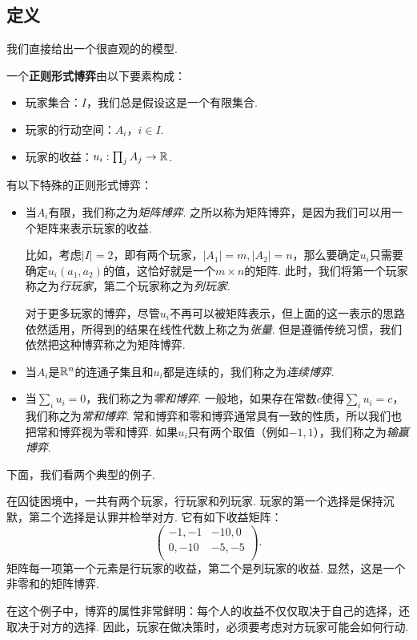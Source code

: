 \subsection{定义}

我们直接给出一个很直观的的模型. 

\begin{definition}[正则形式博弈]
一个\textbf{正则形式博弈}由以下要素构成：
\begin{itemize}
    \item 玩家集合：$I$，我们总是假设这是一个有限集合.
    \item 玩家的行动空间：$A_i$，$i\in I$.
    \item 玩家的收益：$u_i:\prod_j A_j\to\mathbb{R}$.
\end{itemize}
\end{definition}

有以下特殊的正则形式博弈：
\begin{itemize}
    \item 当$A_i$有限，我们称之为\textit{矩阵博弈}. 之所以称为矩阵博弈，是因为我们可以用一个矩阵来表示玩家的收益. 
    
    比如，考虑$|I|=2$，即有两个玩家，$|A_1|=m,|A_2|=n$，那么要确定$u_i$只需要确定$u_i(a_1,a_2)$的值，这恰好就是一个$m\times n$的矩阵. 此时，我们将第一个玩家称之为\textit{行玩家}，第二个玩家称之为\textit{列玩家}.

    对于更多玩家的博弈，尽管$u_i$不再可以被矩阵表示，但上面的这一表示的思路依然适用，所得到的结果在线性代数上称之为\textit{张量}. 但是遵循传统习惯，我们依然把这种博弈称之为矩阵博弈.

    \item 当$A_i$是$\mathbb{R}^n$的连通子集且和$u_i$都是连续的，我们称之为\textit{连续博弈}.
    \item 当$\sum_i u_i=0$，我们称之为\textit{零和博弈}. 一般地，如果存在常数$c$使得$\sum_i u_i=c$，我们称之为\textit{常和博弈}. 常和博弈和零和博弈通常具有一致的性质，所以我们也把常和博弈视为零和博弈. 如果$u_i$只有两个取值（例如$-1,1$），我们称之为\textit{输赢博弈}.
\end{itemize}

下面，我们看两个典型的例子. 

\begin{example}[囚徒困境]\label{ex:prisoner}
在囚徒困境中，一共有两个玩家，行玩家和列玩家. 玩家的第一个选择是保持沉默，第二个选择是认罪并检举对方. 它有如下收益矩阵：
\[
\begin{pmatrix}
-1,-1&-10,0\\
0,-10&-5,-5\\
\end{pmatrix}.
\]
矩阵每一项第一个元素是行玩家的收益，第二个是列玩家的收益. 显然，这是一个非零和的矩阵博弈. 

在这个例子中，博弈的属性非常鲜明：每个人的收益不仅仅取决于自己的选择，还取决于对方的选择. 因此，玩家在做决策时，必须要考虑对方玩家可能会如何行动. 
\end{example}

